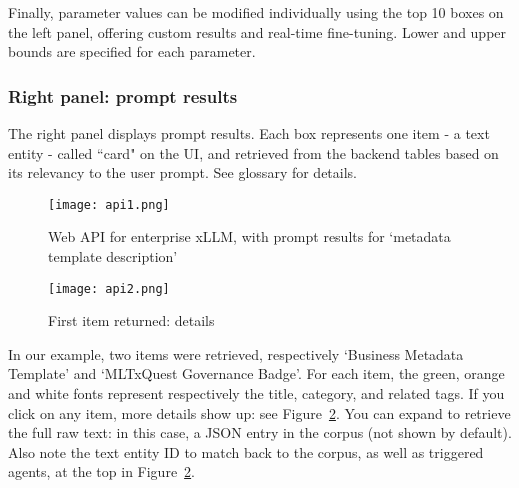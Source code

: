 \documentclass[10pt]{article}
\begin{document}
{Finally, parameter values can be modified individually using the top 10 boxes on the left panel, offering custom results and real-time fine-tuning. Lower and upper bounds are specified for each parameter. 
 
\subsubsection{Right panel: prompt results}

The right panel displays prompt results. Each box represents one item - a \textcolor{index}{text entity} - called ``card" on the UI, and retrieved from the \textcolor{index}{backend tables} based on its relevancy to the user prompt. See glossary for details. \vspace{1ex}


\begin{figure}[H]
\centering
\texttt{[image: api1.png]}
\caption{Web API for enterprise xLLM, with prompt results for `metadata template description'}
\label{figs20nhghg87b}
\end{figure}

\begin{figure}[H]
\centering
\texttt{[image: api2.png]}
\caption{First item returned: details}
\label{figs20nhghg87bcx}
\end{figure}


In our example, two items were retrieved, respectively `Business Metadata Template' and `MLTxQuest Governance Badge'. 
For each item, the green, orange and white fonts represent respectively the title, category, and related tags. If you click on any item,
 more details show up: see Figure~\ref{figs20nhghg87bcx}. You can expand to retrieve the full raw text: in this case,  a JSON entry in the corpus (not shown by default).  
Also note the 
\textcolor{index}{text entity ID} to match back to the corpus, as well as triggered \textcolor{index}{agents}, at the top in   Figure~\ref{figs20nhghg87bcx}.
\vspace{1ex}

}
\end{document}
